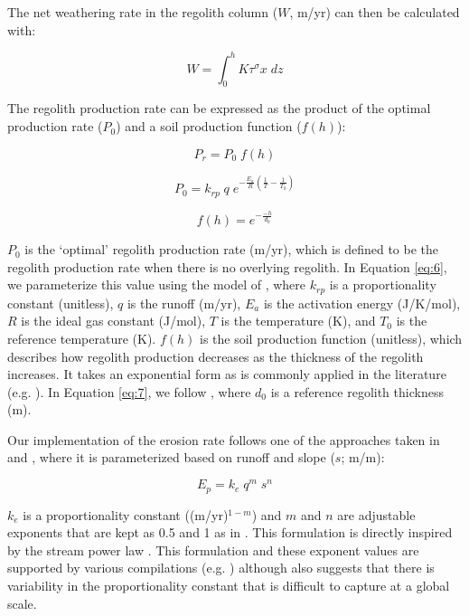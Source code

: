 \documentclass[11pt,letterpaper]{article}
\begin{document}
The net weathering rate in the regolith column ($W$, m/yr) can then be calculated with:

\begin{equation}
    W = \int_{0}^{h} K \tau^{\sigma} x\;dz
    \label{eq:4}
\end{equation}

The regolith production rate can be expressed as the product of the optimal production rate ($P_{0}$) and a soil production function ($f(h)$):

\begin{equation}
    P_{r} = P_{0}\;f(h)
    \label{eq:5}
\end{equation}

\begin{equation}
    P_{0} = k_{rp}\;q\;e^{-\frac{E_{a}}{R}\left(\frac{1}{T}-\frac{1}{T_{0}}\right)}
    \label{eq:6}
\end{equation}

\begin{equation}
    f(h) = e^{-\frac{-h}{d_{0}}}
    \label{eq:7}
\end{equation}

\noindent
$P_{0}$ is the `optimal' regolith production rate (m/yr), which is defined to be the regolith production rate when there is no overlying regolith. In Equation \ref{eq:6}, we parameterize this value using the model of \citet{Carretier2014a}, where $k_{rp}$ is a proportionality constant (unitless), $q$ is the runoff (m/yr), $E_{a}$ is the activation energy (J/K/mol), $R$ is the ideal gas constant (J/mol), $T$ is the temperature (K), and $T_{0}$ is the reference temperature (K). $f(h)$ is the soil production function (unitless), which describes how regolith production decreases as the thickness of the regolith increases. It takes an exponential form as is commonly applied in the literature (e.g. \citealp{Gabet2009a}). In Equation \ref{eq:7}, we follow \citet{Heimsath1997a}, where $d_{0}$ is a reference regolith thickness (m).

Our implementation of the erosion rate follows one of the approaches taken in \citet{Godderis2017c} and \citet{Maffre2018a}, where it is parameterized based on runoff and slope ($s$; m/m):

\begin{equation}
    E_{p} = k_{e}\;q^{m}\;s^{n}
    \label{eq:8}
\end{equation}

\noindent
$k_{e}$ is a proportionality constant ((m/yr)$^{1-m}$) and $m$ and $n$ are adjustable exponents that are kept as 0.5 and 1 as in \citet{Maffre2018a}. This formulation is directly inspired by the stream power law \citep{Davy2000a}. This formulation and these exponent values are supported by various compilations (e.g. \citealp{Lague2013a}) although \citet{Lague2013a} also suggests that there is variability in the proportionality constant that is difficult to capture at a global scale.
\end{document}
